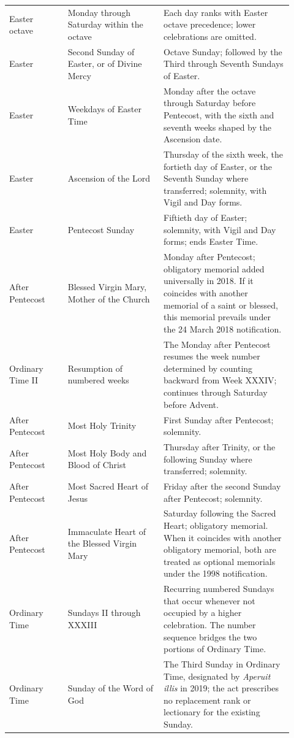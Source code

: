 \begin{longtable}{>{\raggedright\arraybackslash}p{0.19\linewidth}>{\raggedright\arraybackslash}p{0.31\linewidth}>{\raggedright\arraybackslash}p{0.42\linewidth}}
Easter octave & Monday through Saturday within the octave & Each day ranks with Easter octave precedence; lower celebrations are omitted.\\
Easter & Second Sunday of Easter, or of Divine Mercy & Octave Sunday; followed by the Third through Seventh Sundays of Easter.\\
Easter & Weekdays of Easter Time & Monday after the octave through Saturday before Pentecost, with the sixth and seventh weeks shaped by the Ascension date.\\
Easter & Ascension of the Lord & Thursday of the sixth week, the fortieth day of Easter, or the Seventh Sunday where transferred; solemnity, with Vigil and Day forms.\\
Easter & Pentecost Sunday & Fiftieth day of Easter; solemnity, with Vigil and Day forms; ends Easter Time.\\
After Pentecost & Blessed Virgin Mary, Mother of the Church & Monday after Pentecost; obligatory memorial added universally in 2018. If it coincides with another memorial of a saint or blessed, this memorial prevails under the 24 March 2018 notification.\\
Ordinary Time II & Resumption of numbered weeks & The Monday after Pentecost resumes the week number determined by counting backward from Week XXXIV; continues through Saturday before Advent.\\
After Pentecost & Most Holy Trinity & First Sunday after Pentecost; solemnity.\\
After Pentecost & Most Holy Body and Blood of Christ & Thursday after Trinity, or the following Sunday where transferred; solemnity.\\
After Pentecost & Most Sacred Heart of Jesus & Friday after the second Sunday after Pentecost; solemnity.\\
After Pentecost & Immaculate Heart of the Blessed Virgin Mary & Saturday following the Sacred Heart; obligatory memorial. When it coincides with another obligatory memorial, both are treated as optional memorials under the 1998 notification.\\
Ordinary Time & Sundays II through XXXIII & Recurring numbered Sundays that occur whenever not occupied by a higher celebration. The number sequence bridges the two portions of Ordinary Time.\\
Ordinary Time & Sunday of the Word of God & The Third Sunday in Ordinary Time, designated by \emph{Aperuit illis} in 2019; the act prescribes no replacement rank or lectionary for the existing Sunday.\\

\end{longtable}
